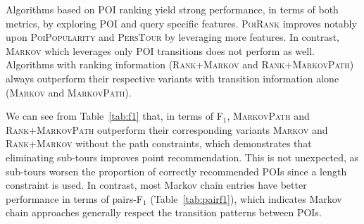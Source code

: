 

Algorithms based on POI ranking yield strong performance, in terms of both metrics, by exploring POI and query specific features.
\textsc{PoiRank} improves notably upon \textsc{PoiPopularity} and \textsc{PersTour} by leveraging more features. %
In contrast, \textsc{Markov} which leverages only POI transitions does not perform as well.
Algorithms with ranking information (\textsc{Rank+Markov} and \textsc{Rank+MarkovPath})
always outperform their respective variants with transition information alone (\textsc{Markov} and \textsc{MarkovPath}).


We can see from Table~\ref{tab:f1} that, in terms of F$_1$, \textsc{MarkovPath} and \textsc{Rank+MarkovPath}
outperform their corresponding variants \textsc{Markov} and \textsc{Rank+Markov} without the path constraints,
which demonstrates that eliminating sub-tours improves point recommendation.
This is not unexpected, 
as sub-tours worsen the proportion of correctly recommended POIs since a length constraint is used.
In contrast, most Markov chain entries have better performance in terms of pairs-F$_1$ (Table~\ref{tab:pairf1}), %
which indicates %
Markov chain approaches generally respect the transition patterns between POIs.


